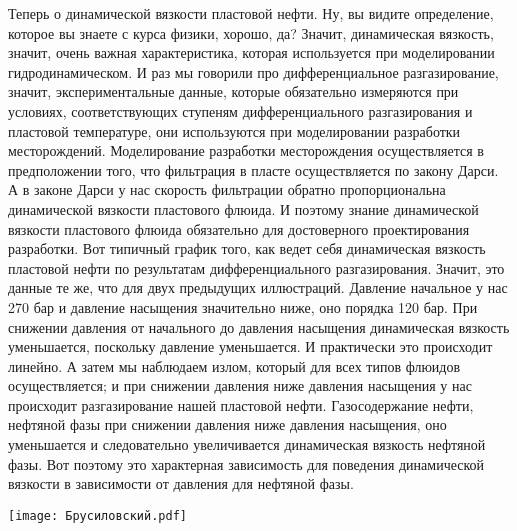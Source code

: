 \documentclass[main.tex]{subfiles}
\begin{document}
Теперь о динамической вязкости пластовой нефти.
Ну, вы видите определение, которое вы знаете с курса физики, хорошо, да?
Значит, динамическая вязкость, значит, очень важная характеристика, которая используется при моделировании гидродинамическом.
И раз мы говорили про дифференциальное разгазирование, значит, экспериментальные данные, которые обязательно измеряются при условиях, соответствующих ступеням дифференциального разгазирования и пластовой температуре, они используются при моделировании разработки месторождений.
Моделирование разработки месторождения осуществляется в предположении того, что фильтрация в пласте осуществляется по закону Дарси.
А в законе Дарси у нас скорость фильтрации обратно пропорциональна динамической вязкости пластового флюида.
И поэтому знание динамической вязкости пластового флюида обязательно для достоверного проектирования разработки.
Вот типичный график того, как ведет себя динамическая вязкость пластовой нефти по результатам дифференциального разгазирования.
Значит, это данные те же, что для двух предыдущих иллюстраций.
Давление начальное у нас 270 бар и давление насыщения значительно ниже, оно порядка 120 бар.
При снижении давления от начального до давления насыщения динамическая вязкость уменьшается, поскольку давление уменьшается.
И практически это происходит линейно.
А затем мы наблюдаем излом, который для всех типов флюидов осуществляется; и при снижении давления ниже давления насыщения у нас происходит разгазирование нашей пластовой нефти.
Газосодержание нефти, нефтяной фазы при снижении давления ниже давления насыщения, оно уменьшается и следовательно увеличивается динамическая вязкость нефтяной фазы.
Вот поэтому это характерная зависимость для поведения динамической вязкости в зависимости от давления для нефтяной фазы.

\begin{center}
\texttt{[image: Брусиловский.pdf]}
\end{center}
\end{document}
